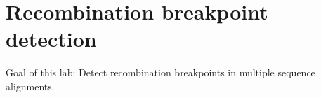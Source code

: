 \chapter{Recombination breakpoint detection}

Goal of this lab:
Detect recombination breakpoints in multiple sequence alignments.

